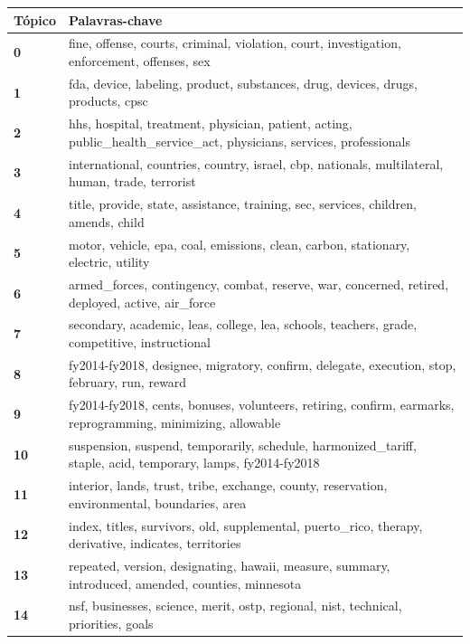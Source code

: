 \begin{table}[htpb]
    \centering
    \scriptsize
    \begin{tabularx}{\textwidth}{@{}l X@{}}
        \toprule
        \textbf{Tópico} & \textbf{Palavras-chave} \\
        \midrule
        \textbf{0} & fine, offense, courts, criminal, violation, court, investigation, enforcement, offenses, sex \\
        \textbf{1} & fda, device, labeling, product, substances, drug, devices, drugs, products, cpsc \\
        \textbf{2} & hhs, hospital, treatment, physician, patient, acting, public\_health\_service\_act, physicians, services, professionals \\
        \textbf{3} & international, countries, country, israel, cbp, nationals, multilateral, human, trade, terrorist \\
        \textbf{4} & title, provide, state, assistance, training, sec, services, children, amends, child \\
        \textbf{5} & motor, vehicle, epa, coal, emissions, clean, carbon, stationary, electric, utility \\
        \textbf{6} & armed\_forces, contingency, combat, reserve, war, concerned, retired, deployed, active, air\_force \\
        \textbf{7} & secondary, academic, leas, college, lea, schools, teachers, grade, competitive, instructional \\
        \textbf{8} & fy2014-fy2018, designee, migratory, confirm, delegate, execution, stop, february, run, reward \\
        \textbf{9} & fy2014-fy2018, cents, bonuses, volunteers, retiring, confirm, earmarks, reprogramming, minimizing, allowable \\
        \textbf{10} & suspension, suspend, temporarily, schedule, harmonized\_tariff, staple, acid, temporary, lamps, fy2014-fy2018 \\
        \textbf{11} & interior, lands, trust, tribe, exchange, county, reservation, environmental, boundaries, area \\
        \textbf{12} & index, titles, survivors, old, supplemental, puerto\_rico, therapy, derivative, indicates, territories \\
        \textbf{13} & repeated, version, designating, hawaii, measure, summary, introduced, amended, counties, minnesota \\
        \textbf{14} & nsf, businesses, science, merit, ostp, regional, nist, technical, priorities, goals \\

\end{tabularx}
\end{table}
